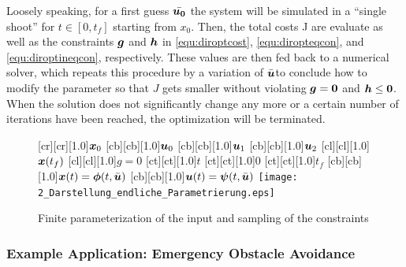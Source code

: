 Loosely speaking, for a first guess $\bar{\boldsymbol{u_0}}$ the system will be simulated in a “single shoot” for $t \in [0,t_f]$  starting from $x_0$. Then, the total costs J are evaluate as well as the constraints $\boldsymbol{g}$ and $\boldsymbol{h}$ in \eqref{equ:diroptcost}, \eqref{equ:diropteqcon}, and \eqref{equ:diroptineqcon}, respectively. These values are then fed back to a numerical solver, which repeats this procedure by a variation of $\bar{\boldsymbol{u}}$to conclude how to modify the parameter so that $J$ gets smaller without violating $\boldsymbol{g}=\boldsymbol{0}$ and $\boldsymbol{h}\leq\boldsymbol{0}$. When the solution does not significantly change any more or a certain number of iterations have been reached, the optimization will be terminated.



\begin{figure}[h]
\centering
	[cr][cr][1.0]{$\boldsymbol{x}_0$}
	[cb][cb][1.0]{$\boldsymbol{u}_0$}
	[cb][cb][1.0]{$\boldsymbol{u}_1$}
	[cb][cb][1.0]{$\boldsymbol{u}_2$}
	[cl][cl][1.0]{$\boldsymbol{x}(t_f)$}
	[cl][cl][1.0]{$g=0$}
	[ct][ct][1.0]{$t$}
	[ct][ct][1.0]{$0$}
	[ct][ct][1.0]{$t_f$}
	[cb][cb][1.0]{$\boldsymbol{x}(t) = \boldsymbol{\phi}(t,\bar{\boldsymbol{u}})$}
	[cb][cb][1.0]{$\boldsymbol{u}(t) = \boldsymbol{\psi}(t,\bar{\boldsymbol{u}})$}
 \texttt{[image: 2\_Darstellung\_endliche\_Parametrierung.eps]}
	\caption[Finite parameterization of the input]{Finite parameterization of the input and sampling of the constraints \cite{papageorgiou2012optimierung}} 
	\label{fig:parametrisierte_nmpc}
\end{figure}


\subsubsection{Example Application: Emergency Obstacle Avoidance}\label{S:57.3.2.2}

